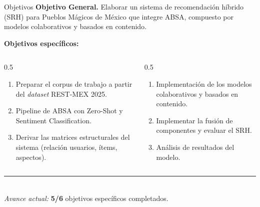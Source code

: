 \documentclass[aspectratio=169,11pt]{beamer}
\begin{document}
\begin{frame}{Objetivos}
	\small
	\textbf{Objetivo General.}\;
	Elaborar un sistema de recomendaci\'on h\'ibrido (SRH) para Pueblos M\'agicos de M\'exico que integre ABSA, compuesto por modelos colaborativos y basados en contenido.

	\vspace{0.6em}
	\textbf{Objetivos espec\'ificos:}
	\begin{columns}[T]
		\begin{column}{0.5\linewidth}
			\begin{enumerate}\setlength\itemsep{3pt}
				\item[\color{accentC}\ding{51}] Preparar el corpus de trabajo a partir del \textit{dataset} REST-MEX 2025.
				\item[\color{accentC}\ding{51}] Pipeline de ABSA con Zero-Shot y Sentiment Classification.
				\item[\color{accentC}\ding{51}] Derivar las matrices estructurales del sistema (relaci\'on usuarios, \'items, aspectos).
			\end{enumerate}
		\end{column}
		\begin{column}{0.5\linewidth}
			\begin{enumerate}\setlength\itemsep{3pt}
				\item[\color{accentC}\ding{51}] Implementaci\'on de los modelos colaborativos y basados en contenido.
				\item[$\square$] Implementar la fusi\'on de componentes y evaluar el SRH.
				\item[$\square$] Análisis de resultados del modelo.
			\end{enumerate}
		\end{column}
	\end{columns}

	\vspace{0.6em}
	\centering
	{\color{rule}\rule{0.4\linewidth}{0.4pt}}\\[0.3em]
	\textit{Avance actual:} \textbf{5/6} objetivos espec\'ificos completados.
\end{frame}
\end{document}

